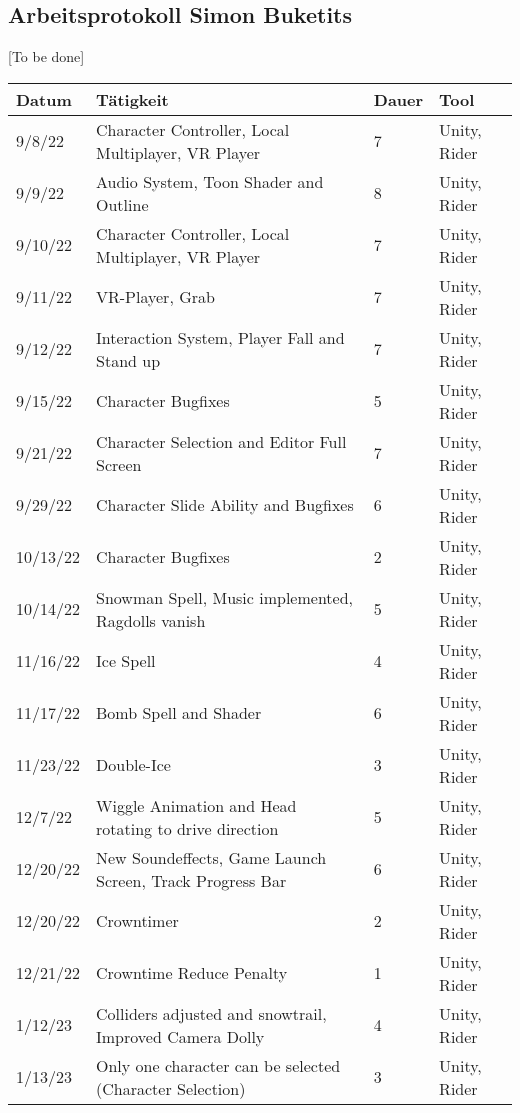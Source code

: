 \subsection{Arbeitsprotokoll Simon Buketits}

[To be done]
\begin{longtable}{|p{1.5cm}|p{6cm}|p{1.2cm}|p{2.7cm}|}
	\hline
	\textbf{Datum} & \textbf{Tätigkeit} & \textbf{Dauer} & \textbf{Tool} \\ \hline
	\endhead
	9/8/22 & Character Controller, Local Multiplayer, VR Player & 7 & Unity, Rider \\ \hline
	9/9/22 & Audio System, Toon Shader and Outline & 8 & Unity, Rider \\ \hline
	9/10/22 & Character Controller, Local Multiplayer, VR Player & 7 & Unity, Rider \\ \hline
	9/11/22 & VR-Player, Grab & 7 & Unity, Rider \\ \hline
	9/12/22 & Interaction System, Player Fall and Stand up & 7 & Unity, Rider \\ \hline
	9/15/22 & Character Bugfixes & 5 & Unity, Rider \\ \hline
	9/21/22 & Character Selection and Editor Full Screen & 7 & Unity, Rider \\ \hline
	9/29/22 & Character Slide Ability and Bugfixes & 6 & Unity, Rider \\ \hline
	10/13/22 & Character Bugfixes & 2 & Unity, Rider \\ \hline
	10/14/22 & Snowman Spell, Music implemented, Ragdolls vanish & 5 & Unity, Rider \\ \hline
	11/16/22 & Ice Spell & 4 & Unity, Rider \\ \hline
	11/17/22 & Bomb Spell and Shader & 6 & Unity, Rider \\ \hline
	11/23/22 & Double-Ice & 3 & Unity, Rider \\ \hline
	12/7/22 & Wiggle Animation and Head rotating to drive direction & 5 & Unity, Rider \\ \hline
	12/20/22 & New Soundeffects, Game Launch Screen, Track Progress Bar & 6 & Unity, Rider \\ \hline
	12/20/22 & Crowntimer & 2 & Unity, Rider \\ \hline
	12/21/22 & Crowntime Reduce Penalty & 1 & Unity, Rider \\ \hline
	1/12/23 & Colliders adjusted and snowtrail, Improved Camera Dolly & 4 & Unity, Rider \\ \hline
	1/13/23 & Only one character can be selected (Character Selection) & 3 & Unity, Rider \\ \hline

\end{longtable}
